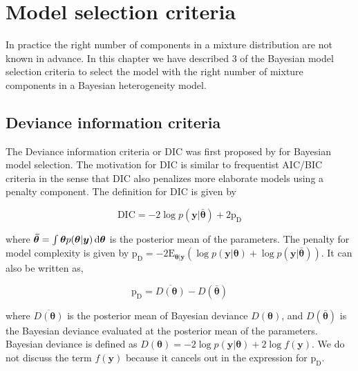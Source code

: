 \chapter{Model selection criteria}
\label{ch : model_selection}

In practice the right number of components in a mixture distribution are not known in advance. In this chapter we have described 3 of the Bayesian model selection criteria to select the model with the right number of mixture components in a Bayesian heterogeneity model.

\section{Deviance information criteria}
\label{sec : dic}

The Deviance information criteria or DIC was first proposed by \citet{spiegelhalter_bayesian_2002} for Bayesian model selection. The motivation for DIC is similar to frequentist AIC/BIC criteria in the sense that DIC also penalizes more elaborate models using a penalty component. The definition for DIC is given by 

$$\text{DIC} = -2\log{p(\boldsymbol{y}|\boldsymbol{\bar{\theta}})} + 2\text{p}_\text{D}$$

where $\boldsymbol{\bar{\theta}} = \int \boldsymbol{\theta} p(\boldsymbol{\theta}|\boldsymbol{y}) \mathop{}\!\mathrm{d}\boldsymbol{\theta}$ is the posterior mean of the parameters. The penalty for model complexity is given by 
$\text{p}_\text{D} = -2\text{E}_{\boldsymbol{\theta}|\boldsymbol{y}}(\log{p(\boldsymbol{y}|\boldsymbol{\theta})} + \log{p(\boldsymbol{y}|\boldsymbol{\bar{\theta}})})$. It can also be written as,

$$\text{p}_\text{D}=\overline{D(\boldsymbol{\theta})} - D(\boldsymbol{\bar{\theta}})$$

where $\overline{D(\boldsymbol{\theta})}$ is the posterior mean of Bayesian deviance $D(\boldsymbol{\theta})$, and $D(\boldsymbol{\bar{\theta}})$ is the Bayesian deviance evaluated at the posterior mean of the parameters. Bayesian deviance is defined as $D(\boldsymbol{\theta}) = -2\log{p(\boldsymbol{y}|\boldsymbol{\theta})} + 2\log{f(\boldsymbol{y})}$. We do not discuss the term $f(\boldsymbol{y})$ because it cancels out in the expression for $\text{p}_\text{D}$.

